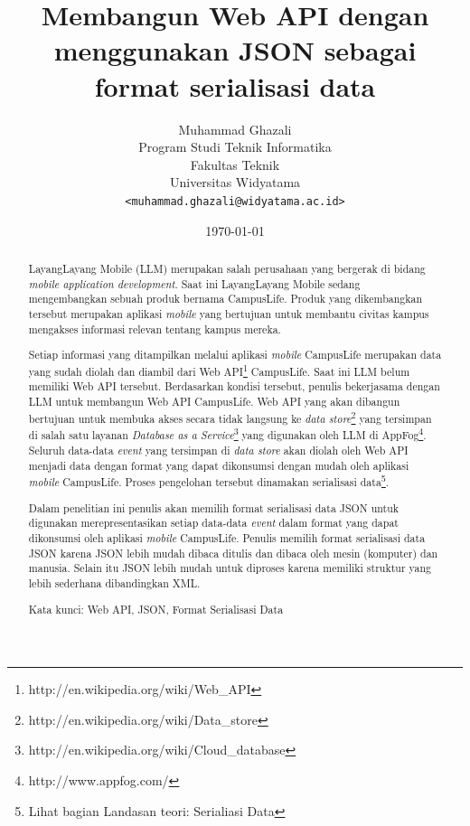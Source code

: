 \documentclass[a4paper, 12pt, oneside]{report}
\title{\textbf{Membangun Web API dengan menggunakan JSON sebagai format serialisasi data}}
\author{
Muhammad Ghazali\\
Program Studi Teknik Informatika\\
Fakultas Teknik\\
Universitas Widyatama
\\\texttt{<muhammad.ghazali@widyatama.ac.id>}
}
\date{\today}
\begin{document}
\maketitle

\onehalfspacing
\tableofcontents
\setcounter{secnumdepth}{5}
\setcounter{tocdepth}{7}

\listoffigures

\listoftables

\begin{abstract}
\onehalfspacing LayangLayang Mobile (LLM) merupakan salah perusahaan yang bergerak di bidang \textit{mobile application development}. Saat ini LayangLayang Mobile sedang mengembangkan sebuah produk bernama CampusLife. Produk yang dikembangkan tersebut merupakan aplikasi \textit{mobile} yang bertujuan untuk membantu civitas kampus mengakses informasi relevan tentang kampus mereka.

\onehalfspacing Setiap informasi yang ditampilkan melalui aplikasi \textit{mobile} CampusLife merupakan data yang sudah diolah dan diambil dari Web API\footnote{http://en.wikipedia.org/wiki/Web\_API} CampusLife. Saat ini LLM belum memiliki Web API tersebut. Berdasarkan kondisi tersebut, penulis bekerjasama dengan LLM untuk membangun Web API CampusLife. Web API yang akan dibangun bertujuan untuk membuka akses secara tidak langsung ke \textit{data store}\footnote{http://en.wikipedia.org/wiki/Data\_store} yang tersimpan di salah satu layanan \textit{Database as a Service}\footnote{http://en.wikipedia.org/wiki/Cloud\_database} yang digunakan oleh LLM di AppFog\footnote{http://www.appfog.com/}. Seluruh data-data \textit{event} yang tersimpan di \textit{data store} akan diolah oleh Web API menjadi data dengan format yang dapat dikonsumsi dengan mudah oleh aplikasi \textit{mobile} CampusLife. Proses pengelohan tersebut dinamakan serialisasi data\footnote{Lihat bagian Landasan teori: Serialiasi Data}.

\onehalfspacing Dalam penelitian ini penulis akan memilih format serialisasi data JSON untuk digunakan merepresentasikan setiap data-data \textit{event} dalam format yang dapat dikonsumsi oleh aplikasi \textit{mobile} CampusLife. Penulis memilih format serialisasi data JSON karena JSON lebih mudah dibaca ditulis dan dibaca oleh mesin (komputer) dan manusia. Selain itu JSON lebih mudah untuk diproses karena memiliki struktur yang lebih sederhana dibandingkan XML\cite{json-fat-free}\cite{json-vs-xml-debate}.

\begin{flushleft}
\onehalfspacing Kata kunci: Web API, JSON, Format Serialisasi Data
\end{flushleft}

\end{abstract}
\end{document}
